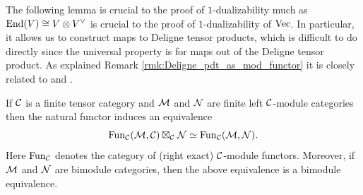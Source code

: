 \documentclass{amsart}
\begin{document}
The following lemma is crucial to the proof of $1$-dualizability much as $\End(V) \cong V \otimes V^\vee$ is crucial to the proof of $1$-dualizability of $\Vec$.  In particular, it allows us to construct maps to Deligne tensor products, which is difficult to do directly since the universal property is for maps out of the Deligne tensor product.    
As explained Remark \ref{rmk:Deligne_pdt_as_mod_functor} it is closely related to \cite[Prop. 3.5 and Rmk. 3.6]{0909.3140} and \cite[Thm. 3.20]{0911.4979}.

\begin{lemma} \label{Lma:FunctorsAsATensorPdt}
	If $\cC$ is a finite tensor category and $\cM$ and $\cN$ are finite left $\cC$-module categories then the natural functor induces an equivalence
	\begin{equation*}
		\Fun_\cC(\cM, \cC) \boxtimes_\cC \cN \simeq \Fun_\cC(\cM,\cN).
	\end{equation*}
	Here $\Fun_\cC$ denotes the category of (right exact) $\cC$-module functors. 
	Moreover, if $\cM$ and $\cN$ are bimodule categories, then the above equivalence is a bimodule equivalence. 
\end{lemma}
\end{document}
